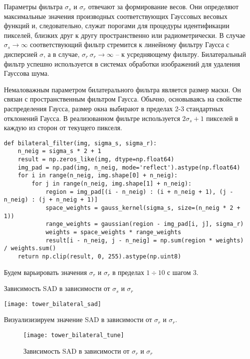 Параметры фильтра $\sigma_s$ и $\sigma_r$ отвечают за формирование весов. Они определяют максимальные значения производных соответствующих Гауссовых весовых функций и, следовательно, служат порогами для процедуры идентификации пикселей, близких друг к другу пространственно или радиометрически. В случае $\sigma_s \rightarrow \infty$ соответствующий фильтр стремится к линейному фильтру Гаусса с дисперсией $\sigma$, а в случае, $\sigma_r\ \sigma_r \rightarrow \infty$ -- к усредняющему фильтру. Билатеральный фильтр успешно используется в системах обработки изображений для удаления Гауссова шума.

Немаловажным параметром билатерального фильтра является размер маски. Он связан с пространственным фильтром Гаусса. Обычно, основываясь на свойстве распределения Гаусса, размер окна выбирают в пределах 2-3 стандартных отклонений Гаусса. В реализованном фильтре используется $2 \sigma_s + 1$ пикселей в каждую из сторон от текущего пикселя.

\begin{lstlisting}[caption={Фунукция для применения билатерального фильтра}]
def bilateral_filter(img, sigma_s, sigma_r):
	n_neig = sigma_s * 2 + 1
	result = np.zeros_like(img, dtype=np.float64)
	img_pad = np.pad(img, n_neig, mode='reflect').astype(np.float64)
	for i in range(n_neig, img.shape[0] + n_neig):
		for j in range(n_neig, img.shape[1] + n_neig):
			region = img_pad[(i - n_neig) : (i + n_neig + 1), (j - n_neig) : (j + n_neig + 1)]
			space_weights = gauss_kernel(sigma_s, size=(n_neig * 2 + 1))
			range_weights = gaussian(region - img_pad[i, j], sigma_r)
			weights = space_weights * range_weights
			result[i - n_neig, j - n_neig] = np.sum(region * weights) / weights.sum()
	return np.clip(result, 0, 255).astype(np.uint8)
\end{lstlisting}

Будем варьировать значения $\sigma_r$ и $\sigma_r$ в пределах $1 \div 10$ с шагом $3$.

\begin{table}[H]
	\centering
	\caption{Зависимость SAD в зависимости от $\sigma_s$ и $\sigma_r$}
	\texttt{[image: tower\_bilateral\_sad]}
\end{table}

Визуализизируем значение SAD в зависимости от $\sigma_r$ и $\sigma_r$.

\begin{figure}[H]
	\centering
	\texttt{[image: tower\_bilateral\_tune]}
	\caption{Зависимость SAD в зависимости от $\sigma_r$ и $\sigma_r$}
\end{figure}

